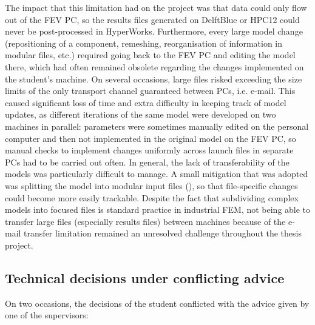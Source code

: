 The impact that this limitation had on the project was that data could only flow out of the FEV PC, so the results files generated on DelftBlue or HPC12 could never be post-processed in HyperWorks. Furthermore, every large model change (repositioning of a component, remeshing, reorganisation of information in modular files, etc.) required going back to the FEV PC and editing the model there, which had often remained obsolete regarding the changes implemented on the student's machine. On several occasions, large files risked exceeding the size limits of the only transport channel guaranteed between PCs, i.e. e-mail. This caused significant loss of time and extra difficulty in keeping track of model updates, as different iterations of the same model were developed on two machines in parallel: parameters were sometimes manually edited on the personal computer and then not implemented in the original model on the FEV PC, so manual checks to implement changes uniformly across launch files in separate PCs had to be carried out often. In general, the lack of transferability of the models was particularly difficult to manage. A small mitigation that was adopted was splitting the model into modular input files (), so that file-specific changes could become more easily trackable. Despite the fact that subdividing complex models into focused files is standard practice in industrial FEM, not being able to transfer large files (especially results files) between machines because of the e-mail transfer limitation remained an unresolved challenge throughout the thesis project.
 
\subsection{Technical decisions under conflicting advice}
\label{subsec:pm-technical}
On two occasions, the decisions of the student conflicted with the advice given by one of the supervisors:

